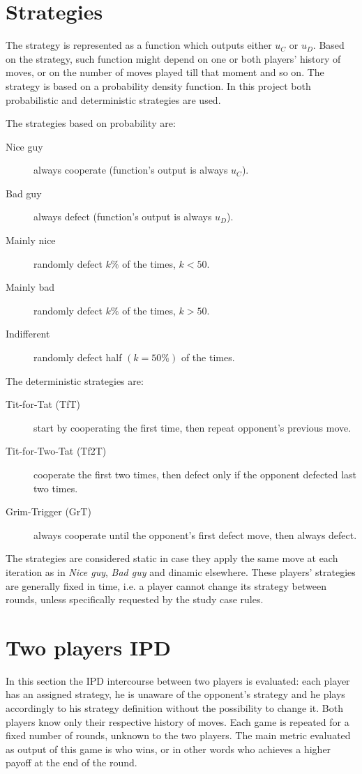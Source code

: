 \documentclass[journal,a4paper,10pt,twoside]{IEEEtran} %
\begin{document}
\section{Strategies} \label{s:str}
The strategy is represented as a function which outputs either $u_C$ or $u_D$. Based on the strategy, such function might depend on one or both players' history of moves, or on the number of moves played till that moment and so on.
The strategy is based on a probability density function. In this project both probabilistic and deterministic strategies are used.

The strategies based on probability are:
\begin{description}
    \item[Nice guy] always cooperate (function's output is always $u_C$).
    \item[Bad guy] always defect (function's output is always $u_D$).
    \item[Mainly nice] randomly defect $k\%$ of the times, $k<50$.%
    \item[Mainly bad] randomly defect $k\%$ of the times, $k>50$.%
    \item[Indifferent] randomly defect half $(k=50\%)$ of the times.
\end{description}

The deterministic strategies are:
\begin{description}
    \item[Tit-for-Tat (TfT)] start by cooperating the first time, then repeat opponent's previous move.
    \item[Tit-for-Two-Tat (Tf2T)] cooperate the first two times, then defect only if the opponent defected last two times.
    \item[Grim-Trigger (GrT)] always cooperate until the opponent's first defect move, then always defect. 
\end{description}

The strategies are considered static in case they apply the same move at each iteration as in \textit{Nice guy}, \textit{Bad guy} and dinamic elsewhere.
These players' strategies are generally fixed in time, i.e. a player cannot change its strategy between rounds, unless specifically requested by the study case rules.%

\section{Two players IPD} \label{s:IPD2P}
In this section the IPD intercourse between two players is evaluated: each player has an assigned strategy, he is unaware of the opponent's strategy and he plays accordingly to his strategy definition without the possibility to change it. Both players know only their respective history of moves. Each game is repeated for a fixed number of rounds, unknown to the two players. The main metric evaluated as output of this game is who wins, or in other words who achieves a higher payoff at the end of the round.
\end{document}
